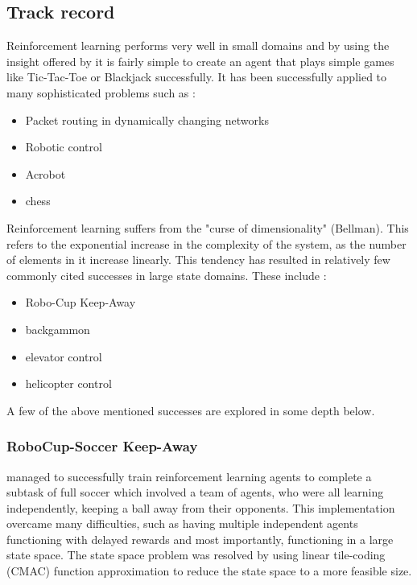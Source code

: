 \documentclass[a4paper]{article}%
\begin{document}
\subsection{Track record}

Reinforcement learning performs very well in small domains and by using the insight offered by \cite{suttonbarto} it is fairly simple to create an agent that plays simple games like Tic-Tac-Toe or Blackjack successfully. It has been successfully applied to many sophisticated problems such as :

\begin{itemize}
\item{Packet routing in dynamically changing networks \citep{boyan94packet}}
\item{Robotic control \citep{rlrobotics}}
\item{Acrobot \citep{suttonbarto} }
\item{chess \citep{baxter98knightcap}}
\end{itemize}

Reinforcement learning suffers from the "curse of dimensionality" (Bellman). This refers to the exponential increase in the complexity of the system, as the number of elements in it increase linearly. This tendency has resulted in relatively few commonly cited successes in large state domains\citep{keepaway}. These include :

\begin{itemize}
\item{Robo-Cup Keep-Away \citep{keepaway}}
\item{backgammon \citep{tdgammon}}
\item{elevator control \citep{elevator}}
\item{helicopter control}
\end{itemize}

A few of the above mentioned successes are explored in some depth below.

\subsubsection{RoboCup-Soccer Keep-Away}
\cite{keepaway} managed to successfully train reinforcement learning agents to complete a subtask of full soccer which involved a team of agents, who were all learning independently, keeping a ball away from their opponents. This implementation overcame many difficulties, such as having multiple independent agents functioning with delayed rewards and most importantly, functioning in a large state space. The state space problem was resolved by using linear tile-coding (CMAC) function approximation to reduce the state space to a more feasible size\citep{keepaway}.
\end{document}
